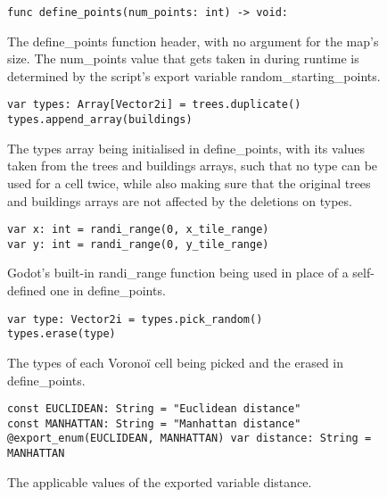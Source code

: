 \begin{figure}[H]
    \centering
    \begin{lstlisting}
func define_points(num_points: int) -> void:
    \end{lstlisting}
    \caption{The define\_points function header, with no argument for the map's size. The num\_points value that gets taken in during runtime is determined by the script's export variable random\_starting\_points.}
    \label{fig:voronoi1}
\end{figure}

\begin{figure}[H]
    \centering
    \begin{lstlisting}
var types: Array[Vector2i] = trees.duplicate()
types.append_array(buildings)
    \end{lstlisting}
    \caption{The types array being initialised in define\_points, with its values taken from the trees and buildings arrays, such that no type can be used for a cell twice, while also making sure that the original trees and buildings arrays are not affected by the deletions on types.}
    \label{fig:voronoi2}
\end{figure}

\begin{figure}[H]
    \centering
    \begin{lstlisting}
var x: int = randi_range(0, x_tile_range)
var y: int = randi_range(0, y_tile_range)
    \end{lstlisting}
    \caption{Godot's built-in randi\_range function being used in place of a self-defined one in define\_points.}
    \label{fig:voronoi3}
\end{figure}

\begin{figure}[H]
    \centering
    \begin{lstlisting}
var type: Vector2i = types.pick_random()
types.erase(type)
    \end{lstlisting}
    \caption{The types of each Voronoï cell being picked and the erased in define\_points.}
    \label{fig:voronoi4}
\end{figure}

\begin{figure}[H]
    \centering
    \begin{lstlisting}
const EUCLIDEAN: String = "Euclidean distance"
const MANHATTAN: String = "Manhattan distance"
@export_enum(EUCLIDEAN, MANHATTAN) var distance: String = MANHATTAN
    \end{lstlisting}
    \caption{The applicable values of the exported variable distance.}
    \label{fig:voronoi5}
\end{figure}

